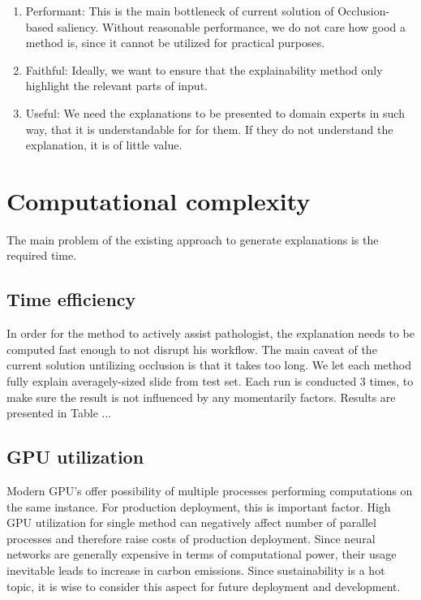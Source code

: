 \begin{enumerate}
    \item Performant: This is the main bottleneck of current solution of Occlusion-based saliency. Without reasonable performance, we do not care how good a method is, since it cannot be utilized for practical purposes.
    \item Faithful: Ideally, we want to ensure that the explainability method only highlight the relevant parts of input.
    \item Useful: We need the explanations to be presented to domain experts in such way, that it is understandable for for them. If they do not understand the explanation, it is of little value. 
    
\end{enumerate}

\section{Computational complexity}

The main problem of the existing approach to generate explanations is the required time.

\subsection*{Time efficiency}

In order for the method to actively assist pathologist, the explanation needs to be computed fast enough to not disrupt his workflow. The main caveat of the current solution untilizing occlusion is that it takes too long. We let each method fully explain averagely-sized slide from test set. Each run is conducted 3 times, to make sure the result is not influenced by any momentarily factors. Results are presented in Table ...

\subsection*{GPU utilization}

Modern GPU's offer possibility of multiple processes performing computations on the same instance. For production deployment, this is important factor. High GPU utilization for single method can negatively affect number of parallel processes and therefore raise costs of production deployment. Since neural networks are generally expensive in terms of computational power, their usage inevitable leads to increase in carbon emissions. Since sustainability is a hot topic, it is wise to consider this aspect for future deployment and development.

